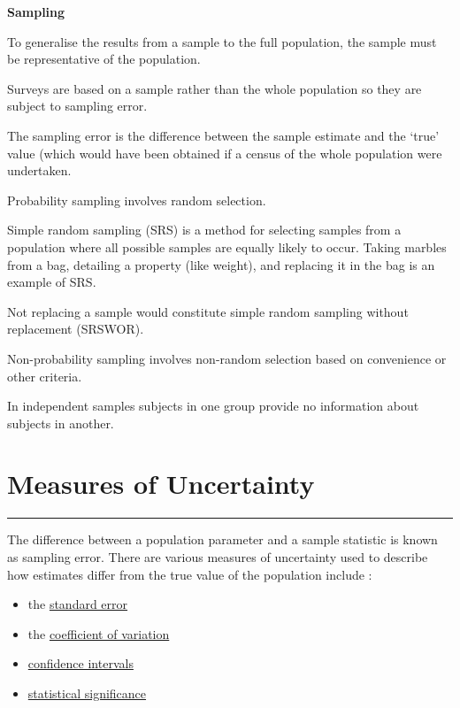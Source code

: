 \documentclass[
]{book}
\begin{document}
\textbf{Sampling}

To generalise the results from a sample to the full population, the sample must be representative of the population.

Surveys are based on a sample rather than the whole population so they are subject to sampling error.

The sampling error is the difference between the sample estimate and the `true' value (which would have been obtained if a census of the whole population were undertaken.

Probability sampling involves random selection.

Simple random sampling (SRS) is a method for selecting samples from a population where all possible samples are equally likely to occur. Taking marbles from a bag, detailing a property (like weight), and replacing it in the bag is an example of SRS.

Not replacing a sample would constitute simple random sampling without replacement (SRSWOR).

Non-probability sampling involves non-random selection based on convenience or other criteria.

In independent samples subjects in one group provide no information about subjects in another.

\hypertarget{error}{%
\chapter{Measures of Uncertainty}\label{error}}

\begin{center}\rule{0.5\linewidth}{0.5pt}\end{center}

The difference between a population parameter and a sample statistic is known as sampling error. There are various measures of uncertainty used to describe how estimates differ from the true value of the population include \citep{uncertainty}:

\begin{itemize}
\item
  the \protect\hyperlink{stderr}{standard error}
\item
  the \protect\hyperlink{coeff}{coefficient of variation}
\item
  \protect\hyperlink{confint}{confidence intervals}
\item
  \protect\hyperlink{signif}{statistical significance}
\end{itemize}
\end{document}
